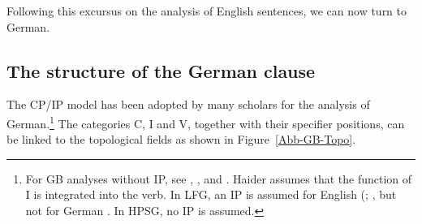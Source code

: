 Following this excursus on the analysis of English sentences, we can now turn to German.



\subsection{The structure of the German clause}
\label{sec-German-clause}

The CP/IP model has been adopted by many scholars for the analysis of German.\footnote{
  For GB analyses without IP, see , ,
   and . Haider assumes
  that the function of I is integrated into the verb. In LFG\indexlfg, an IP is assumed for English
  (\citealp[Section~6.2]{Bresnan2001a}; \citealp[Section~3.2.1]{Dalrymple2001a-u}, but not for German \citep[Section~3.2.3.2]{Berman2003a}.
  In HPSG\indexhpsg, no IP is assumed.
} 
The categories C, I and V, together with their specifier positions, can be linked to the
topological fields as shown in Figure~\vref{Abb-GB-Topo}.


